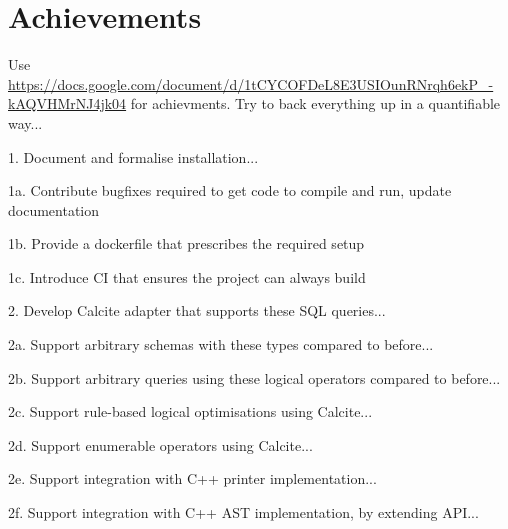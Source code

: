 \section{Achievements}

Use \url{https://docs.google.com/document/d/1tCYCOFDeL8E3USIOunRNrqh6ekP_-kAQVHMrNJ4jk04} for achievments. Try to back everything up in a quantifiable way...



1. Document and formalise installation...

1a. Contribute bugfixes required to get code to compile and run, update documentation

1b. Provide a dockerfile that prescribes the required setup

1c. Introduce CI that ensures the project can always build

2. Develop Calcite adapter that supports these SQL queries...

2a. Support arbitrary schemas with these types compared to before...

2b. Support arbitrary queries using these logical operators compared to before...

2c. Support rule-based logical optimisations using Calcite...

2d. Support enumerable operators using Calcite...

2e. Support integration with C++ printer implementation...

2f. Support integration with C++ AST implementation, by extending API...

